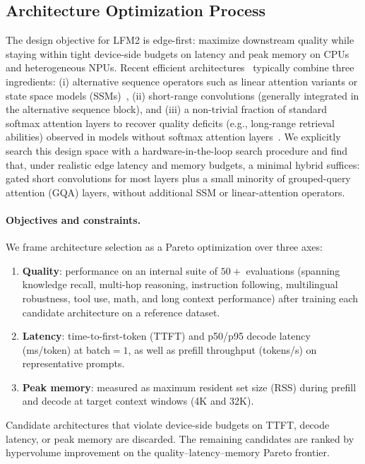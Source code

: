 \documentclass{article}
\begin{document}
\subsection{Architecture Optimization Process}
\label{subsec:arch_opt}

The design objective for LFM2 is edge-first: maximize downstream quality while staying within tight device-side budgets on latency and peak memory on CPUs and heterogeneous NPUs. Recent efficient architectures~\citep{waleffe2024empirical, blakeman2025nemotron, team2025kimi} typically combine three ingredients: (i) alternative sequence operators such as linear attention variants or state space models (SSMs)~\citep{dao2024transformers, yang2025gated}, (ii) short-range convolutions (generally integrated in the alternative sequence block), and (iii) a non-trivial fraction of standard softmax attention layers to recover quality deficits (e.g., long-range retrieval abilities) observed in models without softmax attention layers~\citep{wen2025rnns, park2024can, waleffe2024empirical}. We explicitly search this design space with a hardware-in-the-loop search procedure and find that, under realistic edge latency and memory budgets, a minimal hybrid suffices: gated short convolutions for most layers plus a small minority of grouped-query attention (GQA) layers, without additional SSM or linear-attention operators.


\paragraph{Objectives and constraints.}
We frame architecture selection as a Pareto optimization over three axes:
\begin{enumerate}
    \item \textbf{Quality}: performance on an internal suite of $50+$ evaluations (spanning knowledge recall, multi-hop reasoning, instruction following, multilingual robustness, tool use, math, and long context performance) after training each candidate architecture on a reference dataset.
    \item \textbf{Latency}: time-to-first-token (TTFT) and p50/p95 decode latency (ms/token) at batch$=1$, as well as prefill throughput (tokens/s) on representative prompts.
    \item \textbf{Peak memory}: measured as maximum resident set size (RSS) during prefill and decode at target context windows (4K and 32K).
\end{enumerate}
Candidate architectures that violate device-side budgets on TTFT, decode latency, or peak memory are discarded.  The remaining candidates are ranked by hypervolume improvement on the quality–latency–memory Pareto frontier.
\end{document}
